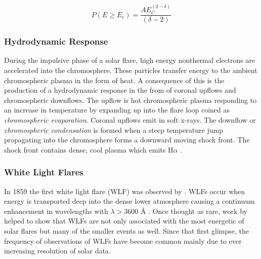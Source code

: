 \begin{equation}\label{pnth1}
P(E \geq E_{c}) = \frac{AE_{C}^{(2-\delta)}}{(\delta - 2)}
\end{equation}

\subsubsection{Hydrodynamic Response}
During the impulsive phase of a solar flare, high energy nonthermal electrons are accelerated into the chromosphere. These particles transfer energy to the ambient chromospheric plasma in the form of heat. A consequence of this is the production of a hydrodynamic response in the from of coronal upflows and chromospheric downflows. The upflow is hot chromospheric plasma responding to an increase in temperature by expanding up into the flare loop coined as \emph{chromospheric evaporation}. Coronal upflows emit in soft x-rays. The downflow or \emph{chromospheric condensation} is formed when a steep temperature jump propagating into the chromosphere forms a downward moving shock front. The shock front contains dense, cool plasma which emits H$\alpha$ \citep{1981SoPh...73..269L, 1990ApJ...348..333C, 2015SoPh..tmp...61K}. 



\subsubsection{White Light Flares}
In 1859 the first white light flare (WLF) was observed by \cite{1859MNRAS..20...13C}. 
WLFs occur when energy is transported deep into the dense lower atmosphere causing a continuum enhancement in wavelengths with $\lambda > 3600$ Å \citep{1983SoPh...88..275N}. 
Once thought as rare, work by \cite{2003A&A...409.1107M} helped to show that WLFs are not only associated with the most energetic of solar flares but many of the smaller events as well. Since that first glimpse, the frequency of observations of WLFs have become common mainly due to ever increasing resolution of solar data. 


